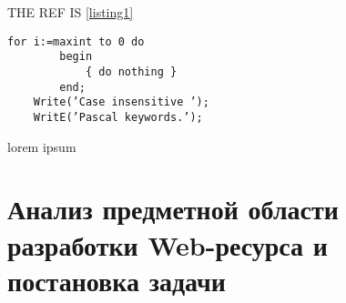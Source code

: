 THE REF IS \ref{listing1}



\begin{lstlisting}[caption=example, xleftmargin=1.2cm]
    for i:=maxint to 0 do
        begin
            { do nothing }
        end;
    Write(’Case insensitive ’);
    WritE(’Pascal keywords.’);
    \end{lstlisting}
lorem ipsum

\section{Анализ предметной области разработки Web-ресурса и постановка задачи}

